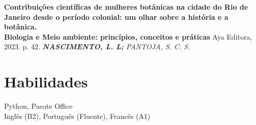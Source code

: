 \documentclass[11pt,a4paper]{article}
\newcommand{\blueitem}[1]{\textcolor{subtitleblue}{\textbf{#1}}}
\begin{document}
\blueitem{Contribuições científicas de mulheres botânicas na cidade do Rio de Janeiro desde o período colonial: um olhar sobre a história e a botânica.} \\
\textbf{Biologia e Meio ambiente: princípios, conceitos e práticas} Aya Editora, 2023. p. 42. 
\textit{\textbf{NASCIMENTO, L. L;} PANTOJA, S. C. S.}

\vspace{0.2em}



\section*{Habilidades}
Python, Pacote Office \\
Inglês (B2), Portuguẽs (Fluente), Francês (A1)

\end{document}
